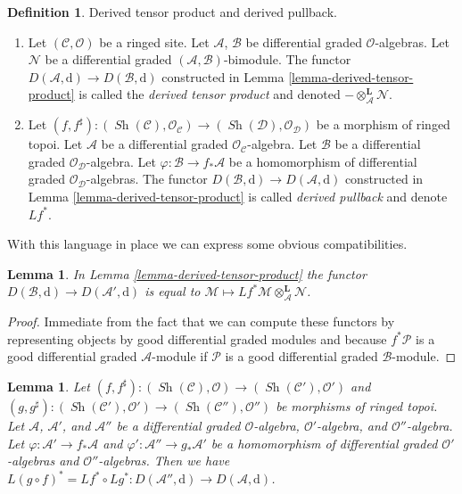 \documentclass{stacks-project}
\theoremstyle{plain}
\newtheorem{lemma}[subsection]{Lemma}
\theoremstyle{definition}
\newtheorem{definition}[subsection]{Definition}
\theoremstyle{remark}
\numberwithin{equation}{subsection}
\def\Sh{\mathop{\mathit{Sh}}\nolimits}
\begin{document}
\begin{definition}
\label{definition-pullback}
Derived tensor product and derived pullback.
\begin{enumerate}
\item Let $(\mathcal{C}, \mathcal{O})$ be a ringed site. Let
$\mathcal{A}$, $\mathcal{B}$ be differential graded $\mathcal{O}$-algebras.
Let $\mathcal{N}$ be a  differential graded
$(\mathcal{A}, \mathcal{B})$-bimodule.
The functor $D(\mathcal{A}, \text{d}) \to D(\mathcal{B}, \text{d})$
constructed in Lemma \ref{lemma-derived-tensor-product}
is called the {\it derived tensor product} and denoted
$- \otimes_\mathcal{A}^\mathbf{L} \mathcal{N}$.
\item Let $(f, f^\sharp) : (\Sh(\mathcal{C}), \mathcal{O}_\mathcal{C})
\to (\Sh(\mathcal{D}), \mathcal{O}_\mathcal{D})$
be a morphism of ringed topoi. Let $\mathcal{A}$ be a differential
graded $\mathcal{O}_\mathcal{C}$-algebra. Let $\mathcal{B}$ be a
differential graded $\mathcal{O}_\mathcal{D}$-algebra. Let
$\varphi : \mathcal{B} \to f_*\mathcal{A}$ be a homomorphism
of differential graded $\mathcal{O}_\mathcal{D}$-algebras.
The functor $D(\mathcal{B}, \text{d}) \to D(\mathcal{A}, \text{d})$
constructed in Lemma \ref{lemma-derived-tensor-product}
is called {\it derived pullback}
and denote $Lf^*$.
\end{enumerate}
\end{definition}

\noindent
With this language in place we can express some obvious compatibilities.

\begin{lemma}
\label{lemma-compose-pullback-tensor}
In Lemma \ref{lemma-derived-tensor-product} the functor
$D(\mathcal{B}, \text{d}) \to D(\mathcal{A}', \text{d})$ is equal to
$\mathcal{M} \mapsto
Lf^*\mathcal{M} \otimes_\mathcal{A}^\mathbf{L} \mathcal{N}$.
\end{lemma}

\begin{proof}
Immediate from the fact that we can compute these functors
by representing objects by good differential graded modules
and because $f^*\mathcal{P}$ is a good differential graded
$\mathcal{A}$-module if $\mathcal{P}$ is a good differential
graded $\mathcal{B}$-module.
\end{proof}

\begin{lemma}
\label{lemma-compose-pullback}
Let $(f, f^\sharp) : (\Sh(\mathcal{C}), \mathcal{O})
\to (\Sh(\mathcal{C}'), \mathcal{O}')$ and
$(g, g^\sharp) : (\Sh(\mathcal{C}'), \mathcal{O}')
\to (\Sh(\mathcal{C}''), \mathcal{O}'')$
be morphisms of ringed topoi. Let $\mathcal{A}$, $\mathcal{A}'$, and
$\mathcal{A}''$ be a differential graded $\mathcal{O}$-algebra,
$\mathcal{O}'$-algebra, and $\mathcal{O}''$-algebra. Let
$\varphi : \mathcal{A}' \to f_*\mathcal{A}$ and
$\varphi' : \mathcal{A}'' \to g_*\mathcal{A}'$
be a homomorphism of differential graded $\mathcal{O}'$-algebras
and $\mathcal{O}''$-algebras.
Then we have $L(g \circ f)^* = Lf^* \circ Lg^* :
D(\mathcal{A}'', \text{d}) \to D(\mathcal{A}, \text{d})$.
\end{lemma}
\end{document}
